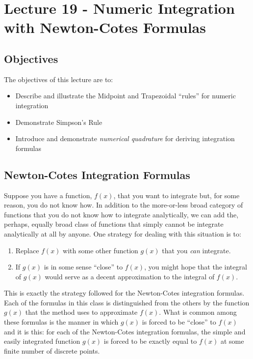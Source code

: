 \chapter{Lecture 19 - Numeric Integration with Newton-Cotes Formulas}
\label{ch:lec19n}
\section{Objectives}
The objectives of this lecture are to:
\begin{itemize}
\item Describe and illustrate the Midpoint and Trapezoidal ``rules'' for numeric integration
\item Demonstrate Simpson's Rule
\item Introduce and demonstrate \emph{numerical quadrature} for deriving integration formulas
\end{itemize}
\setcounter{lstannotation}{0}

\section{Newton-Cotes Integration Formulas}
Suppose you have a function, $f(x)$, that you want to integrate but, for some reason, you do not know how.  In addition to the more-or-less broad category of functions that you do not know how to integrate analytically, we can add the, perhaps, equally broad class of functions that simply cannot be integrate analytically at all by anyone.  One strategy for dealing with this situation is to:
\begin{enumerate}
\item Replace $f(x)$ with some other function $g(x)$ that you \emph{can} integrate.
\item If $g(x)$ is in some sense ``close'' to $f(x)$, you might hope that the integral of $g(x)$ would serve as a decent approximation to the integral of $f(x)$.
\end{enumerate}

This is exactly the strategy followed for the Newton-Cotes integration formulas.  Each of the formulas in this class is distinguished from the others by the function $g(x)$ that the method uses to approximate $f(x)$.  What is common among these formulas is the manner in which $g(x)$ is forced to be ``close'' to $f(x)$ and it is this: for each of the Newton-Cotes integration formulas, the simple and easily integrated function $g(x)$ is forced to be exactly equal to $f(x)$ at some finite number of discrete points.

